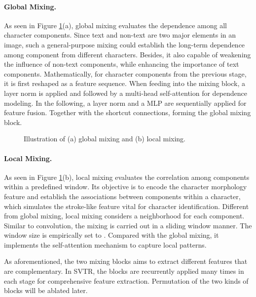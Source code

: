 \documentclass{article}
\begin{document}
\paragraph{Global Mixing.}As seen in Figure \ref{fig:globallocal}(a), global mixing evaluates the dependence among all character components. Since text and non-text are two major elements in an image, such a general-purpose mixing could establish the long-term dependence among component from different characters. Besides, it also capable of weakening the influence of non-text components, while enhancing the importance of text components. Mathematically, for character components  from the previous stage, it is first reshaped as a feature sequence. When feeding into the mixing block, a layer norm is applied and followed by a multi-head self-attention for dependence modeling. In the following, a layer norm and a MLP are sequentially applied for feature fusion. Together with the shortcut connections, forming the global mixing block.


\begin{figure}[t]
	\centering  \subfigbottomskip=2pt \subfigcapskip=-1pt 
\caption{Illustration of (a) global mixing and (b) local mixing.} \label{fig:globallocal}  \end{figure}


\paragraph{Local Mixing.}As seen in Figure \ref{fig:globallocal}(b), local mixing evaluates the correlation among components within a predefined window. Its objective is to encode the character morphology feature and establish the associations between components within a character, which simulates the stroke-like feature vital for character identification. Different from global mixing, local mixing considers a neighborhood for each component. Similar to convolution, the mixing is carried out in a sliding window manner. The window size is empirically set to . Compared with the global mixing, it implements the self-attention mechanism to capture local patterns.


As aforementioned, the two mixing blocks aims to extract different features that are complementary. In SVTR, the blocks are recurrently applied many times in each stage for comprehensive feature extraction. Permutation of the two kinds of blocks will be ablated later.
\end{document}
